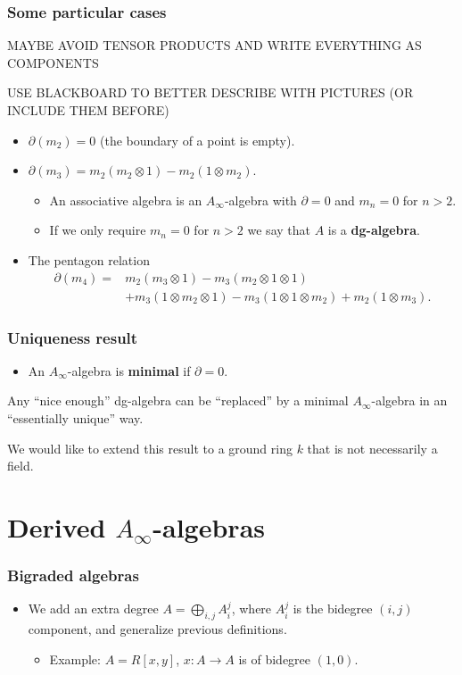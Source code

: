 \documentclass{beamer}
\theoremstyle{definition}
\begin{document}
\begin{frame}
\frametitle{Some particular cases}
MAYBE AVOID TENSOR PRODUCTS AND WRITE EVERYTHING AS COMPONENTS

USE BLACKBOARD TO BETTER DESCRIBE WITH PICTURES (OR INCLUDE THEM BEFORE)
\begin{itemize}
\item<1-> $\partial(m_2)=0$ (the boundary of a point is empty).
\item<2-> $\partial(m_3)=m_2(m_2\otimes 1)-m_2(1\otimes m_2)$.
\begin{itemize}
\item<3-> An associative algebra is an $A_\infty$-algebra with $\partial=0$ and $m_n=0$ for $n>2$.
\item<3-> If we only require $m_n=0$ for $n>2$ we say that $A$ is a \textbf{dg-algebra}. %
\end{itemize}
\item<4-> The pentagon relation \begin{align*}
\partial(m_4)=&m_2(m_3\otimes 1)-m_3(m_2\otimes 1\otimes 1)\\
&+m_3(1\otimes m_2\otimes 1)-m_3(1\otimes 1\otimes m_2)+m_2(1\otimes m_3).
\end{align*}
\end{itemize}
\end{frame}

\begin{frame}
\frametitle{Uniqueness result}
\begin{itemize}
\item An $A_\infty$-algebra is \textbf{minimal} if $\partial = 0$. 
\end{itemize}\pause
\begin{theorem}[Kadeishvili]
Any ``nice enough'' dg-algebra can be ``replaced'' by a minimal $A_\infty$-algebra in an ``essentially unique'' way.
\end{theorem}\pause
We would like to extend this result to a ground ring $k$ that is not necessarily a field.
\end{frame}

\section{Derived $A_\infty$-algebras}

\begin{frame}
\frametitle{Bigraded algebras}
\begin{itemize}
\item We add an extra degree $A=\bigoplus_{i,j} A_i^j$, where $A_i^j$ is the bidegree $(i,j)$ component, and generalize previous definitions.
\begin{itemize}
\item<2-> Example: $A=R[x,y]$, $x:A\to A$ is of bidegree $(1,0)$.
\end{itemize}
\end{itemize}
\end{frame}
\end{document}
